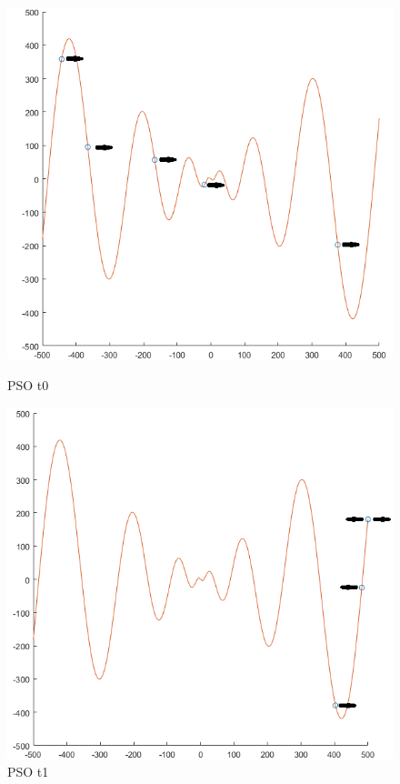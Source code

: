 \documentclass[a4paper,12pt,titlepage]{article}
\begin{document}
\newpage

\begin{figure}[!ht]
\centering
\begin{minipage}{.5\textwidth}
  \centering
  \includegraphics[width=\textwidth]{1.png}
  \caption{PSO t0}
  \label{fig:1}
\end{minipage}%
\begin{minipage}{.5\textwidth}
  \centering
  \includegraphics[width=\textwidth]{2.png}
  \caption{PSO t1}
  \label{fig:2}
\end{minipage}
\end{figure}
\end{document}
